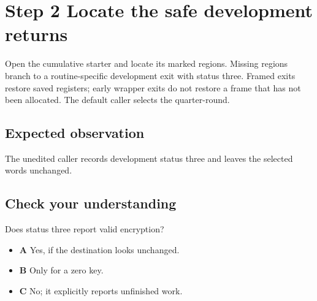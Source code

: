 \section{Step 2 Locate the safe development returns}\label{chacha-s02}

Open the cumulative starter and locate its marked regions. Missing regions branch to a routine-specific development exit with status three. Framed exits restore saved registers; early wrapper exits do not restore a frame that has not been allocated. The default caller selects the quarter-round.

\subsection{Expected observation}
The unedited caller records development status three and leaves the selected words unchanged.

\subsection{Check your understanding}
Does status three report valid encryption?

\begin{itemize}
  \item \textbf{A} Yes, if the destination looks unchanged.
  \item \textbf{B} Only for a zero key.
  \item \textbf{C} No; it explicitly reports unfinished work.
\end{itemize}
